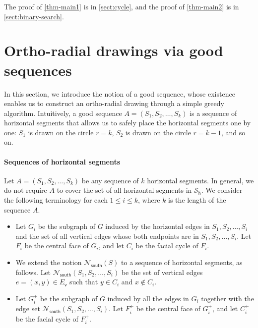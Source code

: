 \documentclass{article}\usepackage[a4paper,margin=20mm]{geometry}
\makeatletter
\newtheorem{theorem}{Theorem}\newtheorem{lemma}[theorem]{Lemma}\newtheorem{proposition}[theorem]{Proposition}\newtheorem{corollary}[theorem]{Corollary}\newtheorem{definition}[theorem]{Definition}\newtheorem{claim}[theorem]{Claim}\newtheorem{remark}[theorem]{Remark}\newtheorem{observation}[theorem]{Observation}\newtheorem{conjecture}[theorem]{Conjecture}\newtheorem{example}[theorem]{Example}
\newcommand{\RR}{\mathcal{R}}
\newcommand{\EV}{E_\mathsf{v}}
\newcommand{\PH}{\mathcal{S}_\mathsf{h}}
\newcommand{\Nsouth}{\mathcal{N}_\mathsf{south}}
\newcommand\IfRestateTF{%
  \ifx\label\thmt@gobble@label %
    \expandafter\@firstoftwo
  \else
    \expandafter\@secondoftwo
  \fi
}
\newcommand{\RestateRemark}{\IfRestateTF{{\normalfont\bfseries (Restated) }}{}}
\makeatother
\begin{document}





The proof of \cref{thm-main1} is in \cref{sect:cycle}, and the proof of \cref{thm-main2} is in \cref{sect:binary-search}. 

\section{Ortho-radial drawings via good sequences}\label{sect:drawing}

In this section, we introduce the notion of a good sequence, whose existence enables us to construct an ortho-radial drawing through a simple greedy algorithm. Intuitively, a good sequence $A = (S_1, S_2, \ldots, S_{k})$ is a sequence of horizontal segments that allows us to safely place the horizontal segments one by one: $S_1$ is drawn on the circle $r=k$, $S_2$ is drawn on the circle $r = k-1$, and so on.  


\paragraph{Sequences of horizontal segments} Let $A = (S_1, S_2, \ldots, S_{k})$ be any sequence of $k$ horizontal segments. In general, we do not require $A$ to cover the set of all horizontal segments in $\PH$. We consider the following terminology for each $1 \leq i \leq k$, where $k$ is the length of the sequence $A$.
\begin{itemize}
    \item Let $G_i$ be the subgraph of $G$ induced by the horizontal edges in $S_1, S_2, \ldots, S_{i}$ and the set of all vertical edges whose both endpoints are in $S_1, S_2, \ldots, S_{i}$.
 Let $F_i$ be the central face of $G_i$, and let $C_i$ be the facial cycle of $F_i$.
    \item We extend the notion $\Nsouth(S)$ to a sequence of horizontal segments, as follows. Let $\Nsouth(S_1, S_2, \ldots, S_{i})$ be the set of vertical edges $e = (x,y) \in \EV$ such that $y \in C_i$ and $x \notin C_i$. 
    \item Let $G_i^+$ be the subgraph of $G$ induced by all the edges in $G_i$ together with the edge set $\Nsouth(S_1, S_2, \ldots, S_{i})$. Let $F_i^+$ be the central face of $G_i^+$, and let $C_i^+$ be the facial cycle of $F_i^+$.
\end{itemize}
\end{document}
